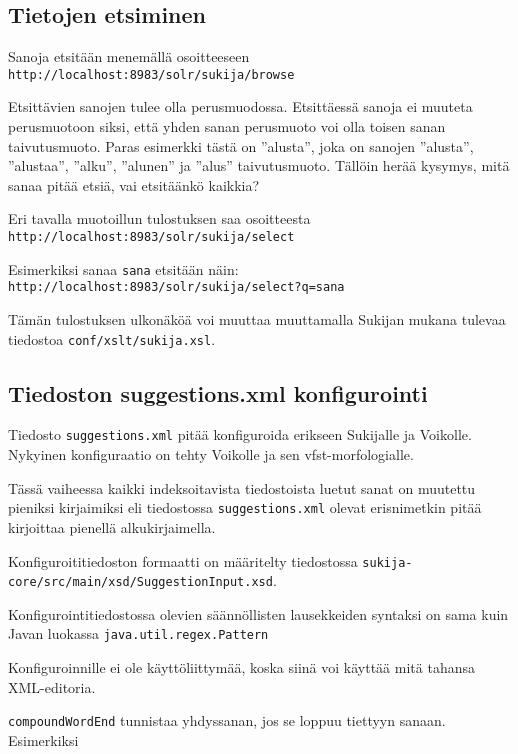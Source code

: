 \documentclass[12pt]{article}
\begin{document}
\subsection*{Tietojen etsiminen}

Sanoja etsitään menemällä osoitteeseen
\verb=http://localhost:8983/solr/sukija/browse=

Etsittävien sanojen tulee olla perusmuodossa. Etsittäessä sanoja ei
muuteta perusmuotoon siksi, että yhden sanan perusmuoto voi olla
toisen sanan taivutusmuoto. Paras esimerkki tästä on ''alusta'', joka
on sanojen ''alusta'', ''alustaa'', ''alku'', ''alunen'' ja ''alus''
taivutusmuoto. Tällöin herää kysymys, mitä sanaa pitää etsiä, vai
etsitäänkö kaikkia?


Eri tavalla muotoillun tulostuksen saa osoitteesta
\verb=http://localhost:8983/solr/sukija/select=

Esimerkiksi sanaa \verb=sana= etsitään näin:
\verb|http://localhost:8983/solr/sukija/select?q=sana|

Tämän tulostuksen ulkonäköä voi muuttaa muuttamalla Sukijan mukana
tulevaa tiedostoa \verb=conf/xslt/sukija.xsl=.


\subsection*{Tiedoston suggestions.xml konfigurointi}


Tiedosto \verb|suggestions.xml| pitää konfiguroida erikseen
Sukijalle ja Voikolle. Nykyinen konfiguraatio on tehty Voikolle ja sen
vfst-morfologialle.

Tässä vaiheessa kaikki indeksoitavista tiedostoista luetut sanat on
muutettu pieniksi kirjaimiksi eli tiedostossa
\verb|suggestions.xml| olevat erisnimetkin pitää kirjoittaa
pienellä alkukirjaimella.

Konfiguroititiedoston formaatti on määritelty tiedostossa
\verb=sukija-core/src/main/xsd/SuggestionInput.xsd=.

Konfigurointitiedostossa olevien säännöllisten lausekkeiden syntaksi on
sama kuin Javan luokassa \verb=java.util.regex.Pattern=

Konfiguroinnille ei ole käyttöliittymää, koska siinä voi käyttää mitä
tahansa XML-editoria.




\bigskip
\verb|compoundWordEnd| tunnistaa yhdyssanan, jos se loppuu tiettyyn sanaan.
Esimerkiksi
\end{document}
